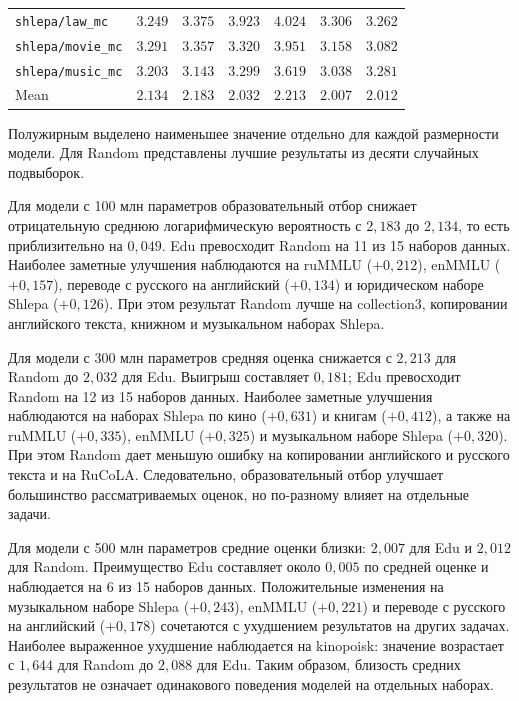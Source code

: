 \documentclass[12pt,a4paper]{article}
\begin{document}
\begin{table}[htbp]
\begin{tabular}{@{}lrrrrrr@{}}
\texttt{shlepa/law\_mc}
& $\mathbf{3.249}$ & $3.375$ & $\mathbf{3.923}$ & $4.024$ & $3.306$ & $\mathbf{3.262}$ \\
\texttt{shlepa/movie\_mc}
& $\mathbf{3.291}$ & $3.357$ & $\mathbf{3.320}$ & $3.951$ & $3.158$ & $\mathbf{3.082}$ \\
\texttt{shlepa/music\_mc}
& $3.203$ & $\mathbf{3.143}$ & $\mathbf{3.299}$ & $3.619$ & $\mathbf{3.038}$ & $3.281$ \\
\midrule
Mean
& $\mathbf{2.134}$ & $2.183$ & $\mathbf{2.032}$ & $2.213$ & $\mathbf{2.007}$ & $2.012$ \\
\bottomrule
\end{tabular}
\par\smallskip
\begin{minipage}{0.98\textwidth}
\footnotesize
Полужирным выделено наименьшее значение отдельно для каждой размерности модели.
Для Random представлены лучшие результаты из десяти случайных подвыборок.
\end{minipage}
\end{table}

Для модели с 100 млн параметров образовательный отбор снижает отрицательную
среднюю логарифмическую вероятность с $2{,}183$ до $2{,}134$,
то есть приблизительно на $0{,}049$.
Edu превосходит Random на 11 из 15 наборов данных.
Наиболее заметные улучшения наблюдаются на ruMMLU ($+0{,}212$),
enMMLU ($+0{,}157$), переводе с русского на английский ($+0{,}134$)
и юридическом наборе Shlepa ($+0{,}126$).
При этом результат Random лучше на collection3, копировании английского
текста, книжном и музыкальном наборах Shlepa.

Для модели с 300 млн параметров средняя оценка снижается с $2{,}213$
для Random до $2{,}032$ для Edu. Выигрыш составляет $0{,}181$;
Edu превосходит Random на 12 из 15 наборов данных.
Наиболее заметные улучшения наблюдаются на наборах Shlepa по кино
($+0{,}631$) и книгам ($+0{,}412$), а также на ruMMLU ($+0{,}335$),
enMMLU ($+0{,}325$) и музыкальном наборе Shlepa ($+0{,}320$).
При этом Random дает меньшую ошибку на копировании английского
и русского текста и на RuCoLA. Следовательно, образовательный отбор
улучшает большинство рассматриваемых оценок, но по-разному влияет на отдельные задачи.

Для модели с 500 млн параметров средние оценки близки:
$2{,}007$ для Edu и $2{,}012$ для Random.
Преимущество Edu составляет около $0{,}005$ по средней оценке
и наблюдается на 6 из 15 наборов данных.
Положительные изменения на музыкальном наборе Shlepa ($+0{,}243$),
enMMLU ($+0{,}221$) и переводе с русского на английский ($+0{,}178$)
сочетаются с ухудшением результатов на других задачах.
Наиболее выраженное ухудшение наблюдается на kinopoisk:
значение возрастает с $1{,}644$ для Random до $2{,}088$ для Edu.
Таким образом, близость средних результатов не означает одинакового
поведения моделей на отдельных наборах.
\end{document}
